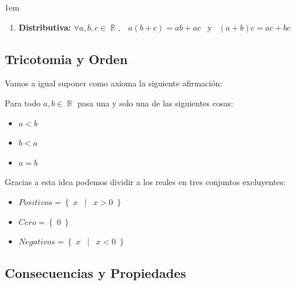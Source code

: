 \documentclass[12pt, fleqn]{report}                             %
\newenvironment{SmallIndentation}[1][0.75em]                    %
        {\begin{adjustwidth}{#1}{}\begin{footnotesize}}             %
        {\end{footnotesize}\end{adjustwidth}}                       %
\DeclareMathOperator \Space     {\quad}                         %
\DeclareMathOperator \MiniSpace {\;}                            %
\newcommand \Such           {\MiniSpace | \MiniSpace}           %
\newcommand \Also           {\MiniSpace \text{y} \MiniSpace}    %
\theoremstyle{break}                                            %
\DeclareMathOperator \Reals        {\mathbb{R}}                 %
\newcommand{\Set}[1]            {\left\{ \; #1 \; \right\}}     %
\begin{document}
\begin{SmallIndentation}[1em]
\begin{enumerate}
                        \item 
                            \textbf{Distributiva:}
                            $\forall a, b, c \in \Reals, \MiniSpace
                                    a(b + c) = ab + ac \Also (a + b)c = ac + bc$

                    \end{enumerate}

                \end{SmallIndentation}


            \clearpage
            \subsection{Tricotomia y Orden}

                Vamos a igual suponer como axioma la siguiente afirmación:

                Para todo $a, b \in \Reals$ pasa una y solo una de las siguientes cosas:

                \begin{itemize}
                    \item $a < b$
                    \item $b < a$
                    \item $a = b$
                \end{itemize}


                Gracias a esta idea podemos dividir a los reales en tres conjuntos excluyentes:
                \begin{itemize}
                    \item $Positivos = \Set{x \Such x > 0}$
                    \item $Cero = \Set{0}$
                    \item $Negativos = \Set{x \Such x < 0}$
                \end{itemize}

            \clearpage
            \subsection{Consecuencias y Propiedades}
\end{document}
